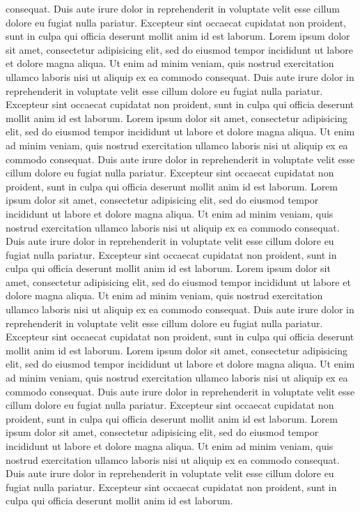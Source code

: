        consequat. Duis aute irure dolor in reprehenderit in voluptate velit esse
       cillum dolore eu fugiat nulla pariatur. Excepteur sint occaecat cupidatat non
       proident, sunt in culpa qui officia deserunt mollit anim id est laborum.
       Lorem ipsum dolor sit amet, consectetur adipisicing elit, sed do eiusmod
       tempor incididunt ut labore et dolore magna aliqua. Ut enim ad minim veniam,
       quis nostrud exercitation ullamco laboris nisi ut aliquip ex ea commodo
       consequat. Duis aute irure dolor in reprehenderit in voluptate velit esse
       cillum dolore eu fugiat nulla pariatur. Excepteur sint occaecat cupidatat non
       proident, sunt in culpa qui officia deserunt mollit anim id est laborum.
       Lorem ipsum dolor sit amet, consectetur adipisicing elit, sed do eiusmod
       tempor incididunt ut labore et dolore magna aliqua. Ut enim ad minim veniam,
       quis nostrud exercitation ullamco laboris nisi ut aliquip ex ea commodo
       consequat. Duis aute irure dolor in reprehenderit in voluptate velit esse
       cillum dolore eu fugiat nulla pariatur. Excepteur sint occaecat cupidatat non
       proident, sunt in culpa qui officia deserunt mollit anim id est laborum.
       Lorem ipsum dolor sit amet, consectetur adipisicing elit, sed do eiusmod
       tempor incididunt ut labore et dolore magna aliqua. Ut enim ad minim veniam,
       quis nostrud exercitation ullamco laboris nisi ut aliquip ex ea commodo
       consequat. Duis aute irure dolor in reprehenderit in voluptate velit esse
       cillum dolore eu fugiat nulla pariatur. Excepteur sint occaecat cupidatat non
       proident, sunt in culpa qui officia deserunt mollit anim id est laborum.
       Lorem ipsum dolor sit amet, consectetur adipisicing elit, sed do eiusmod
       tempor incididunt ut labore et dolore magna aliqua. Ut enim ad minim veniam,
       quis nostrud exercitation ullamco laboris nisi ut aliquip ex ea commodo
       consequat. Duis aute irure dolor in reprehenderit in voluptate velit esse
       cillum dolore eu fugiat nulla pariatur. Excepteur sint occaecat cupidatat non
       proident, sunt in culpa qui officia deserunt mollit anim id est laborum.
       Lorem ipsum dolor sit amet, consectetur adipisicing elit, sed do eiusmod
       tempor incididunt ut labore et dolore magna aliqua. Ut enim ad minim veniam,
       quis nostrud exercitation ullamco laboris nisi ut aliquip ex ea commodo
       consequat. Duis aute irure dolor in reprehenderit in voluptate velit esse
       cillum dolore eu fugiat nulla pariatur. Excepteur sint occaecat cupidatat non
       proident, sunt in culpa qui officia deserunt mollit anim id est laborum.
       Lorem ipsum dolor sit amet, consectetur adipisicing elit, sed do eiusmod
       tempor incididunt ut labore et dolore magna aliqua. Ut enim ad minim veniam,
       quis nostrud exercitation ullamco laboris nisi ut aliquip ex ea commodo
       consequat. Duis aute irure dolor in reprehenderit in voluptate velit esse
       cillum dolore eu fugiat nulla pariatur. Excepteur sint occaecat cupidatat non
       proident, sunt in culpa qui officia deserunt mollit anim id est laborum.
